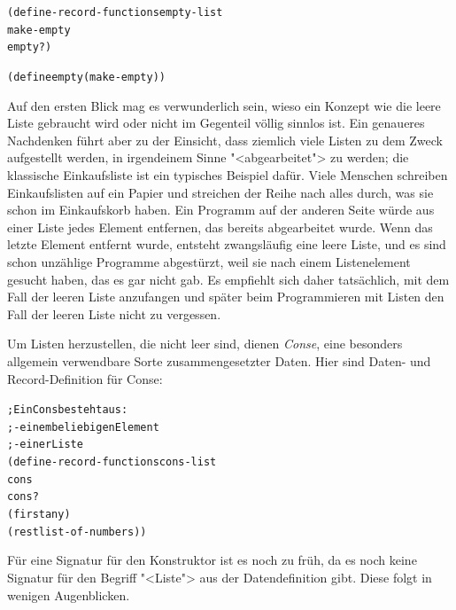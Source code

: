 %
\begin{alltt}
(define-record-functions empty-list
  make-empty
  empty?)

(define empty (make-empty))
\end{alltt}
%
Auf den ersten Blick mag es verwunderlich sein, wieso ein Konzept wie
die  leere Liste gebraucht wird oder nicht im Gegenteil völlig sinnlos
ist.  Ein genaueres Nachdenken führt aber zu der Einsicht, dass
ziemlich viele Listen zu dem Zweck aufgestellt werden, in irgendeinem
Sinne "<abgearbeitet"> zu werden; die klassische Einkaufsliste ist ein
typisches Beispiel dafür. Viele Menschen schreiben Einkaufslisten auf
ein Papier und streichen der Reihe nach alles durch, was sie schon im
Einkaufskorb haben.  Ein Programm auf der anderen Seite würde aus
einer Liste jedes Element entfernen, das bereits abgearbeitet wurde.
Wenn das letzte Element entfernt wurde, entsteht zwangsläufig eine
leere Liste, und es sind schon unzählige Programme abgestürzt, weil
sie nach einem Listenelement gesucht haben, das es gar nicht gab.  Es
empfiehlt sich daher tatsächlich, mit dem Fall der leeren Liste
anzufangen und später beim Programmieren mit Listen den Fall der
leeren Liste nicht zu vergessen.

Um Listen herzustellen, die nicht leer
sind, dienen \textit{Conse}, eine besonders allgemein
verwendbare Sorte zusammengesetzter Daten.  Hier sind Daten- und
Record-Definition für Conse:\label{def:cons}
%
\begin{alltt}
; Ein Cons besteht aus:
; - einem beliebigen Element
; - einer Liste
(define-record-functions cons-list
  cons
  cons?
  (first any)
  (rest  list-of-numbers))
\end{alltt}
%
Für eine Signatur für den Konstruktor ist es noch zu früh, da es noch
keine Signatur für den Begriff "<Liste"> aus der Datendefinition
gibt.  Diese folgt in wenigen Augenblicken.

